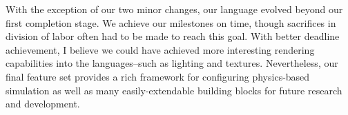 With the exception of our two minor changes, our language evolved
beyond our first completion stage. We achieve our milestones on time,
though sacrifices in division of labor often had to be made to reach
this goal. With better deadline achievement, I believe we could have
achieved more interesting rendering capabilities into the
languages--such as lighting and textures. Nevertheless, our final
feature set provides a rich framework for configuring physics-based
simulation as well as many easily-extendable building blocks for
future research and development.
